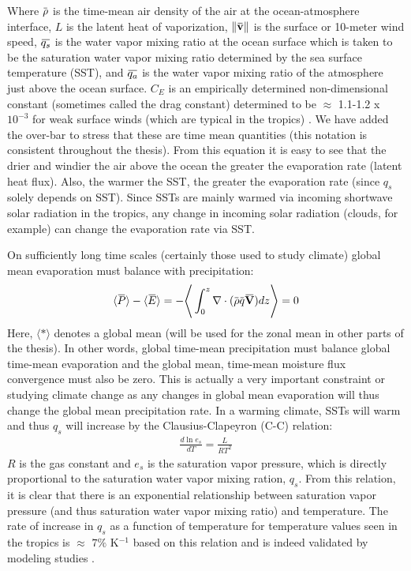 \documentclass[letterpaper,12pt,titlepage,oneside,final]{book}
\newcommand{\norm}[1]{\lVert#1\rVert}
\newcommand{\overbar}[1]{\mkern 1.5mu\overline{\mkern-1.5mu#1\mkern-1.5mu}\mkern 1.5mu}
\begin{document}
Where $\overbar\rho$ is the time-mean air density of the air at the ocean-atmosphere interface, $L$ is the latent heat of vaporization, $\norm{\overbar{\textbf{v}}}$ is the surface or 10-meter wind speed, $\overbar{q_{s}}$ is the water vapor mixing ratio at the ocean surface which is taken to be the saturation water vapor mixing ratio determined by the sea surface temperature (SST), and $\overbar{q_{a}}$ is the water vapor mixing ratio of the atmosphere just above the ocean surface. $C_{E}$ is an empirically determined non-dimensional constant (sometimes called the drag constant) determined to be $\approx$ 1.1-1.2 x $10^{-3}$ for weak surface winds (which are typical in the tropics) \citep{katsaros_evaporation_2001}. We have added the over-bar to stress that these are time mean quantities (this notation is consistent throughout the thesis). From this equation it is easy to see that the drier and windier the air above the ocean the greater the evaporation rate (latent heat flux). Also, the warmer the SST, the greater the evaporation rate (since $q_{s}$ solely depends on SST). Since SSTs are mainly warmed via incoming shortwave solar radiation in the tropics, any change in incoming solar radiation (clouds, for example) can change the evaporation rate via SST. 

On sufficiently long time scales (certainly those used to study climate) global mean evaporation must balance with precipitation:
\begin{align}
\langle\overbar{P}\rangle-\langle\overbar{E}\rangle=-\Bigg\langle\int_{0}^{z}\mathbf{\nabla}\cdot(\overbar{\rho}{\overbar{q}}\overbar{\mathbf{V}})dz\Bigg\rangle=0
\end{align}
Here, $\langle{*}\rangle$ denotes a global mean (will be used for the zonal mean in other parts of the thesis). In other words, global time-mean precipitation must balance global time-mean evaporation and the global mean, time-mean moisture flux convergence must also be zero. This is actually a very important constraint or studying climate change as any changes in global mean evaporation will thus change the global mean precipitation rate. In a warming climate, SSTs will warm and thus $q_{s}$ will increase by the Clausius-Clapeyron (C-C) relation:
\begin{align}
\frac{d\ln{e_{s}}}{dT}=\frac{L}{RT^{2}}
\end{align}
$R$ is the gas constant and $e_{s}$ is the saturation vapor pressure, which is directly proportional to the saturation water vapor mixing ration, $q_{s}$. From this relation, it is clear that there is an exponential relationship between saturation vapor pressure (and thus saturation water vapor mixing ratio) and temperature. The rate of increase in $q_s$ as a function of temperature for temperature values seen in the tropics is $\approx$ $7 \%$ K$^{-1}$ based on this relation and is indeed validated by modeling studies \citep{held_robust_2006,vecchi_weakening_2006}. 
\end{document}
